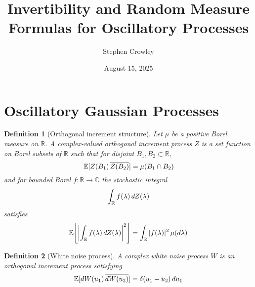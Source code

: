 \documentclass{article}
\newtheorem{definition}{Definition}
\begin{document}
\title{Invertibility and Random Measure Formulas for Oscillatory Processes}

\author{Stephen Crowley}

\date{August 15, 2025}

\maketitle

{\tableofcontents}

\section{Oscillatory Gaussian Processes}

\begin{definition}
  [Orthogonal increment structure]\label{def:orthinc} Let $\mu$ be a positive
  Borel measure on $\mathbb{R}$. A complex-valued orthogonal increment process
  $Z$ is a set function on Borel subsets of $\mathbb{R}$ such that for
  disjoint $B_1, B_2 \subset \mathbb{R}$,
  \begin{equation}
    \mathbb{E} [Z (B_1) \hspace{0.17em} \overline{Z (B_2)}] = \mu (B_1 \cap
    B_2)
  \end{equation}
  and for bounded Borel $f : \mathbb{R} \to \mathbb{C}$ the stochastic
  integral
  \begin{equation}
    \int_{\mathbb{R}} f (\lambda)  \hspace{0.17em} dZ (\lambda)
  \end{equation}
  satisfies
  \begin{equation}
    \mathbb{E} \hspace{-0.17em} \left[ \left| \int_{\mathbb{R}} f (\lambda)
    \hspace{0.17em} dZ (\lambda) \right|^2 \right] = \int_{\mathbb{R}} |f
    (\lambda) |^2  \hspace{0.17em} \mu (d \lambda)
  \end{equation}
\end{definition}

\begin{definition}
  [White noise process]\label{def:whitenoise} A complex white noise process
  $W$ is an orthogonal increment process satisfying
  \begin{equation}
    \mathbb{E} [dW (u_1) \hspace{0.17em} \overline{dW (u_2)}] = \delta (u_1 -
    u_2)  \hspace{0.17em} du_1
  \end{equation}
\end{definition}
\end{document}
